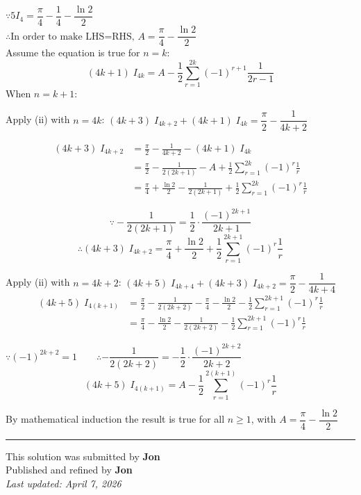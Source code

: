 ﻿\documentclass[12pt]{article}
\begin{document}
$\because 5I_4=\dfrac{\pi}{4} - \dfrac{1}{4} - \dfrac{\ln 2}{2}$\\
$\therefore \text{In order to make LHS=RHS, } A=\dfrac{\pi}{4} - \dfrac{\ln 2}{2}$\\

Assume the equation is true for $n=k$:
$$(4k+1)\;I_{4k}=A-\frac{1}{2}\displaystyle\sum_{r=1}^{2k}\left(-1\right)^{r+1}\frac{1}{2r-1}$$
When $n=k+1$:

Apply (ii) with $n=4k$: \quad $(4k+3)\;I_{4k+2}+(4k+1)\;I_{4k}=\dfrac{\pi}{2}-\dfrac{1}{4k+2}$

\begin{align*}
(4k+3)\;I_{4k+2} &= \frac{\pi}{2}-\frac{1}{4k+2}-(4k+1)\;I_{4k}\\
&= \frac{\pi}{2}-\frac{1}{2(2k+1)}-A+\frac{1}{2}\sum_{r=1}^{2k}(-1)^r\frac{1}{r}\\
&= \frac{\pi}{4}+\frac{\ln 2}{2}-\frac{1}{2(2k+1)}+\frac{1}{2}\sum_{r=1}^{2k}(-1)^r\frac{1}{r}
\end{align*}

$$\because -\dfrac{1}{2(2k+1)}=\dfrac{1}{2}\cdot\dfrac{(-1)^{2k+1}}{2k+1}$$
$$\boxed{\therefore (4k+3)\;I_{4k+2}=\frac{\pi}{4}+\frac{\ln 2}{2}+\frac{1}{2}\sum_{r=1}^{2k+1}(-1)^r\frac{1}{r}}$$

Apply (ii) with $n=4k+2$: \quad $(4k+5)\;I_{4k+4}+(4k+3)\;I_{4k+2}=\dfrac{\pi}{2}-\dfrac{1}{4k+4}$
\begin{align*}
(4k+5)\;I_{4(k+1)} &= \frac{\pi}{2}-\frac{1}{2(2k+2)}-\frac{\pi}{4}-\frac{\ln 2}{2}-\frac{1}{2}\sum_{r=1}^{2k+1}(-1)^r\frac{1}{r}\\
&= \frac{\pi}{4}-\frac{\ln 2}{2}-\frac{1}{2(2k+2)}-\frac{1}{2}\sum_{r=1}^{2k+1}(-1)^r\frac{1}{r}
\end{align*}

$\because (-1)^{2k+2}=1\qquad \therefore-\dfrac{1}{2(2k+2)}=-\dfrac{1}{2}\cdot\dfrac{(-1)^{2k+2}}{2k+2}$
$$(4k+5)\;I_{4(k+1)}=A-\frac{1}{2}\sum_{r=1}^{2(k+1)}(-1)^r\frac{1}{r}$$

By mathematical induction the result is true for all $n\geqslant 1$, with $\boxed{A=\dfrac{\pi}{4}-\dfrac{\ln 2}{2}}$
\bigskip
\hrule

\begin{center}
    This solution was submitted by \textbf{Jon}\\[4pt]
    Published and refined by \textbf{Jon}\\[8pt]
    \textit{Last updated: April 7, 2026}
\end{center}
\end{document}
